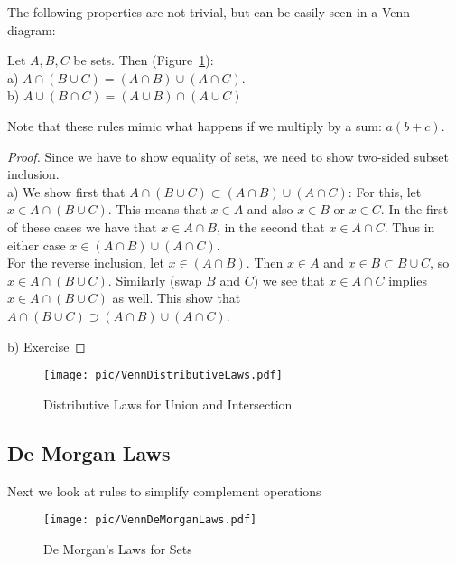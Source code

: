 The following properties are not trivial, but can be easily seen in a Venn
diagram:
\begin{thm}
Let $A,B,C$ be sets. Then (Figure~\ref{figvenndist}):\\
a) $A\cap (B\cup C)=(A\cap B)\cup(A\cap C)$.\\
b) $A\cup (B\cap C)=(A\cup B)\cap(A\cup C)$
\end{thm}
Note that these rules mimic what happens if we multiply by a sum: $a(b+c)$.
\begin{proof}
Since we have to show equality of sets, we need to show two-sided subset
inclusion.\\
a) We show first that $A\cap (B\cup C)\subset (A\cap B)\cup(A\cap C)$: For this,
let $x\in A\cap (B\cup C)$. This means that $x\in A$ and also $x\in B$ or
$x\in C$. In the first of these cases we have that $x\in A\cap B$, in the
second that $x\in A\cap C$. Thus in either case $x\in (A\cap B)\cup (A\cap
C)$. \\
For the reverse inclusion,
let $x\in (A\cap B)$. Then $x\in A$ and $x\in B\subset B\cup C$, so $x\in
A\cap (B\cup C)$. Similarly (swap $B$ and $C$) we see that $x\in A\cap C$
implies $x\in A\cap (B\cup C)$ as well. This show that
$A\cap (B\cup C)\supset (A\cap B)\cup(A\cap C)$.

b) Exercise
\end{proof}

\begin{figure}[t]
\begin{center}
\texttt{[image: pic/VennDistributiveLaws.pdf]}
\end{center}
\caption{Distributive Laws for Union and Intersection}
\label{figvenndist}
\end{figure}

\subsection{De Morgan Laws}

Next we look at rules to simplify complement operations

\begin{figure}[t]
\begin{center}
\texttt{[image: pic/VennDeMorganLaws.pdf]}
\end{center}
\caption{De Morgan's Laws for Sets}
\label{figdemorganset}
\end{figure}

